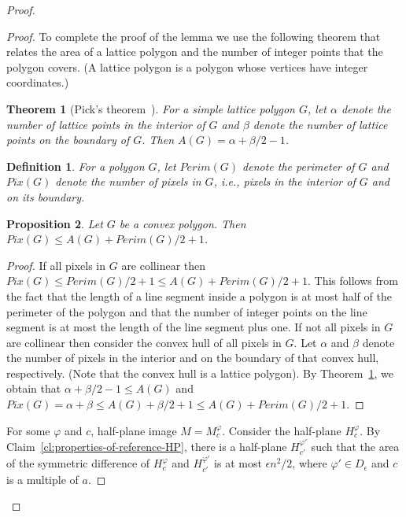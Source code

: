 \documentclass[11pt,english]{article}
\newtheorem{theorem}{Theorem}[section]
\newtheorem{proposition}[theorem]{Proposition}
\newtheorem{definition}{Definition}[section]
\numberwithin{figure}{section}
\newcommand{\hp}[2]{H^{#1}_{#2}}\newcommand{\sepline}[2]{L^{#1}_{#2}}\newcommand{\hpi}[2]{M^{#1}_{#2}}\newcommand{\myerr}[1]{Err(#1)}
\newcommand{\mydelta}{\epsilon} \newcommand{\bigdelta}{{\epsilon_0}} \newcommand{\dsquares}{d_{\rm squares}}
\begin{document}
\begin{proof}
{\begin{proof}
To complete the proof of the lemma we use the following theorem that relates the area of a lattice polygon and the number of integer points that the polygon covers. (A lattice polygon is a polygon whose vertices have integer coordinates.)
\begin{theorem}[Pick's theorem~\cite{pick}]\label{thm:pick}
For a simple lattice polygon $G$, let $\alpha$ denote the number of lattice points in the interior of $G$ and $\beta$ denote the number of lattice points on the boundary of $G$. Then $A(G)=\alpha+\beta/2-1$.
\end{theorem}

\begin{definition}
For a polygon $G$, let $Perim(G)$ denote the perimeter of $G$ and $Pix(G)$ denote the number of pixels in $G$, i.e., pixels in the interior of $G$ and on its boundary.
\end{definition}
\begin{proposition}\label{prop:area-pixel}
Let $G$ be a convex polygon. Then $Pix(G)\leq A(G)+Perim(G)/2+1$.
\end{proposition}
\begin{proof}
If all pixels in $G$ are collinear then $Pix(G)\leq Perim(G)/2+1\leq A(G)+Perim(G)/2+1$. This follows from the fact that the length of a line segment inside a polygon is at most half of the perimeter of the polygon and that the number of integer points on the line segment is at most the length of the line segment plus one. If not all pixels in $G$ are collinear then consider the convex hull of all pixels in $G$. Let $\alpha$ and $\beta$ denote the number of pixels in the interior and on the boundary of that convex hull, respectively. (Note that the convex hull is a lattice polygon). By Theorem~\ref{thm:pick}, we obtain that $\alpha+\beta/2-1\leq A(G)$ and $Pix(G)=\alpha+\beta\leq A(G)+\beta/2+1\leq A(G)+Perim(G)/2+1$.
\end{proof}


For some $\varphi$ and $c$, half-plane image $M=\hpi{\varphi}{c}$. Consider the half-plane $\hp{\varphi}{c}$. By Claim~\ref{cl:properties-of-reference-HP}, there is a half-plane $\hp{\varphi'}{c'}$ such that the area of the symmetric difference of $\hp{\varphi}{c}$ and $\hp{\varphi'}{c'}$ is at most $\mydelta n^2/2$, where $\varphi'\in D_{\mydelta}$ and $c$ is  a multiple of $a$. 


\end{proof}}
\end{proof}
\end{document}
